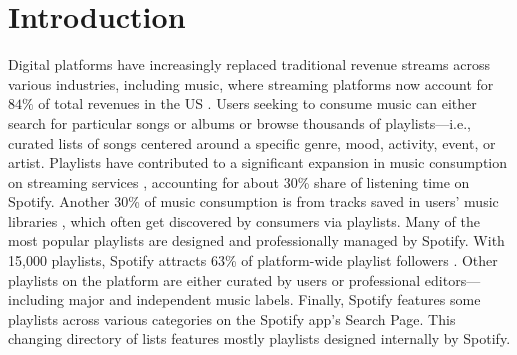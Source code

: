 \documentclass[12pt, a4paper, leqno]{article}
\begin{document}
\begin{titlepage}
\begin{abstract}
\vspace{0.5cm}
\noindent
\textbf{Keywords:} playlist followers, music streaming platforms, playlist featuring, major record labels, causal inference\\
\vspace{0in}\\


\bigskip
\end{abstract}
\setcounter{page}{1}

\end{titlepage}
\newpage


\setcounter{page}{2}





\section{Introduction}
\label{sec:introduction}

Digital platforms have increasingly replaced traditional revenue streams across various industries, including music, where streaming platforms now account for $84\%$ of total revenues in the US \citep{riaa}. Users seeking to consume music can either search for particular songs or albums or browse thousands of playlists---i.e., curated lists of songs centered around a specific genre, mood, activity, event, or artist. Playlists have contributed to a significant expansion in music consumption on streaming services \citep{Datta_etal_MktScie}, accounting for about $30$\% share of listening time on Spotify. Another $30$\% of music consumption is from tracks saved in users' music libraries \citep[][]{spotifyf1filing}, which often get discovered by consumers via playlists. 
Many of the most popular playlists are designed and professionally managed by Spotify.  
With 15,000 playlists, Spotify attracts $63$\% of platform-wide playlist followers \citep[e.g.,][]{Aguiar_Waldfogel_power}.   
Other playlists on the platform are either curated by users or professional editors---including major and independent music labels. Finally, Spotify features some playlists across various categories on the Spotify app’s Search Page. This changing directory of lists features mostly playlists designed internally by Spotify. 
\end{document}
